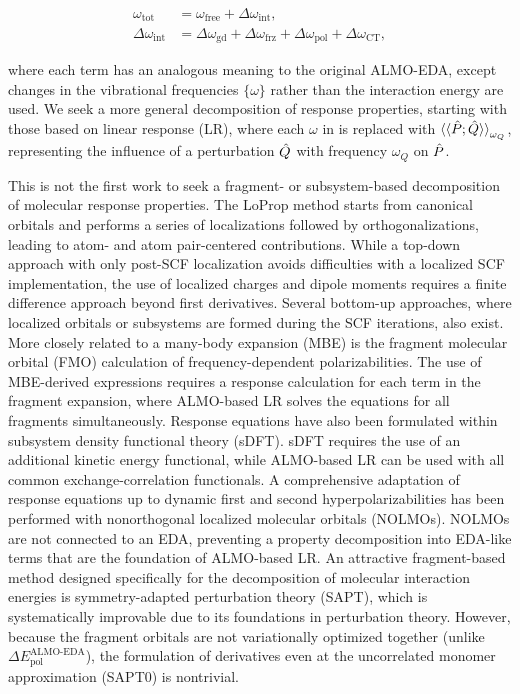 \begin{equation}
  \begin{aligned}
    \label{eq:almo-frequencies}
    \omega_{\text{tot}} &= \omega_{\text{free}} + \Delta \omega_{\text{int}}, \\
    \Delta \omega_{\text{int}} &= \Delta \omega_{\text{gd}} + \Delta \omega_{\text{frz}} + \Delta \omega_{\text{pol}} + \Delta \omega_{\text{CT}},
  \end{aligned}
\end{equation}

where each term has an analogous meaning to the original ALMO-EDA, except changes in the vibrational frequencies \(\{\omega\}\) rather than the interaction energy are used. We seek a more general decomposition of response properties, starting with those based on linear response (LR), where each \(\omega\) in  is replaced with \(\braket{\braket{\hat{P}; \hat{Q}}}_{\omega_{Q}}\), representing the influence of a perturbation \(\hat{Q}\) with frequency \(\omega_{Q}\) on \(\hat{P}\).

This is not the first work to seek a fragment- or subsystem-based decomposition of molecular response properties. The LoProp method\cite{doi:10.1063/1.1778131,JCC:JCC20632} starts from canonical orbitals and performs a series of localizations followed by orthogonalizations, leading to atom- and atom pair-centered contributions. While a top-down approach with only post-SCF localization avoids difficulties with a localized SCF implementation, the use of localized charges and dipole moments requires a finite difference approach beyond first derivatives. Several bottom-up approaches, where localized orbitals or subsystems are formed during the SCF iterations, also exist. More closely related to a many-body expansion (MBE) is the fragment molecular orbital (FMO)\cite{MOCHIZUKI2006418} calculation of frequency-dependent polarizabilities. The use of MBE-derived expressions requires a response calculation for each term in the fragment expansion, where ALMO-based LR solves the equations for all fragments simultaneously. Response equations have also been formulated within subsystem density functional theory (sDFT)\cite{Neugebauer_2009_84104,Pavanello_2013_204118}. sDFT requires the use of an additional kinetic energy functional, while ALMO-based LR can be used with all common exchange-correlation functionals. A comprehensive adaptation of response equations up to dynamic first and second hyperpolarizabilities\cite{JCC:JCC540120409} has been performed with nonorthogonal localized molecular orbitals (NOLMOs)\cite{doi:10.1021/acs.jctc.7b00321}. NOLMOs are not connected to an EDA, preventing a property decomposition into EDA-like terms that are the foundation of ALMO-based LR. An attractive fragment-based method designed specifically for the decomposition of molecular interaction energies is symmetry-adapted perturbation theory (SAPT)\cite{doi:10.1021/cr00031a008}, which is systematically improvable due to its foundations in perturbation theory. However, because the fragment orbitals are not variationally optimized together (unlike \(\Delta E_{\text{pol}}^{\text{ALMO-EDA}}\)), the formulation of derivatives even at the uncorrelated monomer approximation (SAPT0) is nontrivial.

